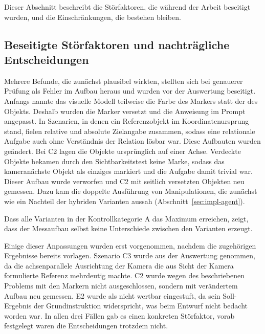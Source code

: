 Dieser Abschnitt beschreibt die Störfaktoren, die während der Arbeit beseitigt wurden, und die Einschränkungen, die bestehen bleiben.

\subsection*{Beseitigte Störfaktoren und nachträgliche Entscheidungen}

Mehrere Befunde, die zunächst plausibel wirkten, stellten sich bei genauerer Prüfung als Fehler im Aufbau heraus und wurden vor der Auswertung beseitigt.
Anfangs nannte das visuelle Modell teilweise die Farbe des Markers statt der des Objekts.
Deshalb wurden die Marker versetzt und die Anweisung im Prompt angepasst.
In Szenarien, in denen ein Referenzobjekt im Koordinatenursprung stand, fielen relative und absolute Zielangabe zusammen, sodass eine relationale Aufgabe auch ohne Verständnis der Relation lösbar war.
Diese Aufbauten wurden geändert.
Bei C2 lagen die Objekte ursprünglich auf einer Achse.
Verdeckte Objekte bekamen durch den Sichtbarkeitstest keine Marke, sodass das kameranächste Objekt als einziges markiert und die Aufgabe damit trivial war.
Dieser Aufbau wurde verworfen und C2 mit seitlich versetzten Objekten neu gemessen.
Dazu kam die doppelte Ausführung von Manipulationen, die zunächst wie ein Nachteil der hybriden Varianten aussah (Abschnitt~\ref{sec:impl-agent}).

Dass alle Varianten in der Kontrollkategorie A das Maximum erreichen, zeigt, dass der Messaufbau selbst keine Unterschiede zwischen den Varianten erzeugt.

Einige dieser Anpassungen wurden erst vorgenommen, nachdem die zugehörigen Ergebnisse bereits vorlagen.
Szenario C3 wurde aus der Auswertung genommen, da die achsenparallele Ausrichtung der Kamera die aus Sicht der Kamera formulierte Referenz mehrdeutig machte.
C2 wurde wegen des beschriebenen Problems mit den Markern nicht ausgeschlossen, sondern mit verändertem Aufbau neu gemessen.
E2 wurde als nicht wertbar eingestuft, da sein Soll-Ergebnis der Grundinstruktion widerspricht, was beim Entwurf nicht bedacht worden war.
In allen drei Fällen gab es einen konkreten Störfaktor, vorab festgelegt waren die Entscheidungen trotzdem nicht.


